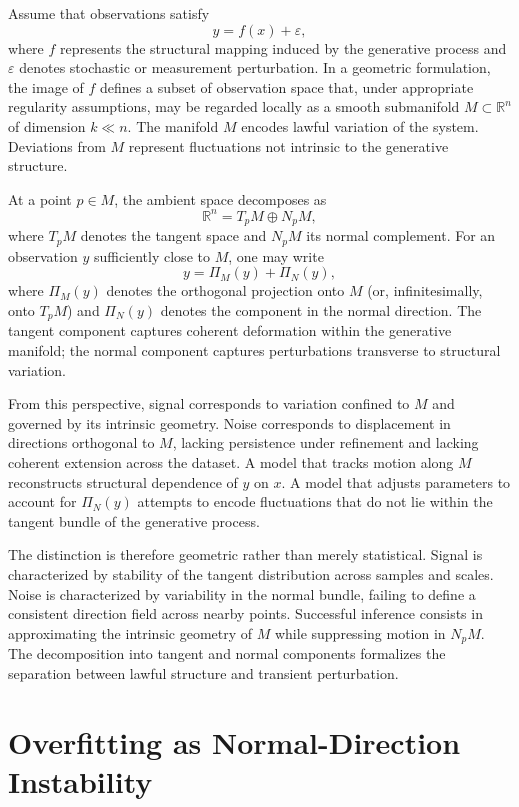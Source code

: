 \documentclass[12pt]{book}
\begin{document}
Assume that observations satisfy
\[
y = f(x) + \varepsilon,
\]
where $f$ represents the structural mapping induced by the generative process and $\varepsilon$ denotes stochastic or measurement perturbation. In a geometric formulation, the image of $f$ defines a subset of observation space that, under appropriate regularity assumptions, may be regarded locally as a smooth submanifold $M \subset \mathbb{R}^n$ of dimension $k \ll n$. The manifold $M$ encodes lawful variation of the system. Deviations from $M$ represent fluctuations not intrinsic to the generative structure.

At a point $p \in M$, the ambient space decomposes as
\[
\mathbb{R}^n = T_p M \oplus N_p M,
\]
where $T_p M$ denotes the tangent space and $N_p M$ its normal complement. For an observation $y$ sufficiently close to $M$, one may write
\[
y = \Pi_M(y) + \Pi_N(y),
\]
where $\Pi_M(y)$ denotes the orthogonal projection onto $M$ (or, infinitesimally, onto $T_p M$) and $\Pi_N(y)$ denotes the component in the normal direction. The tangent component captures coherent deformation within the generative manifold; the normal component captures perturbations transverse to structural variation.

From this perspective, signal corresponds to variation confined to $M$ and governed by its intrinsic geometry. Noise corresponds to displacement in directions orthogonal to $M$, lacking persistence under refinement and lacking coherent extension across the dataset. A model that tracks motion along $M$ reconstructs structural dependence of $y$ on $x$. A model that adjusts parameters to account for $\Pi_N(y)$ attempts to encode fluctuations that do not lie within the tangent bundle of the generative process.

The distinction is therefore geometric rather than merely statistical. Signal is characterized by stability of the tangent distribution across samples and scales. Noise is characterized by variability in the normal bundle, failing to define a consistent direction field across nearby points. Successful inference consists in approximating the intrinsic geometry of $M$ while suppressing motion in $N_p M$. The decomposition into tangent and normal components formalizes the separation between lawful structure and transient perturbation.

\section{Overfitting as Normal-Direction Instability}
\end{document}
